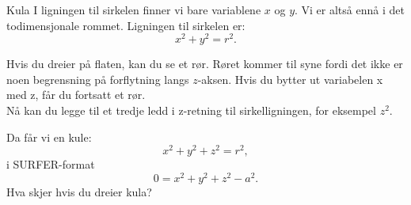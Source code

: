 \begin{surferPage}{Kula}
I ligningen til sirkelen finner vi bare variablene $x$ og $y$. Vi er altså ennå i det todimensjonale rommet. 
Ligningen til sirkelen er:
\[x^2+y^2=r^2.\]

Hvis du dreier på flaten, kan du se et rør. Røret kommer til syne fordi det ikke er 
noen begrensning på forflytning langs $z$-aksen. Hvis du bytter ut variabelen x med z, får du fortsatt 
et rør. \\

Nå kan du legge til et tredje ledd i z-retning til sirkelligningen, for eksempel $z^2$. 

Da får vi en kule:
\[x^2+y^2+z^2=r^2,\]
i SURFER-format
\[0=x^2+y^2+z^2-a^2.\]
Hva skjer hvis du dreier kula?
\end{surferPage}
